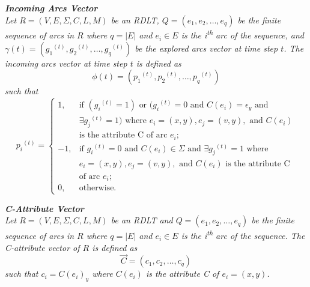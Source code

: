     \begin{defn}\label{def:incoming_arcs_vector}
    \textit{\textbf{Incoming Arcs Vector}\\
    Let $R = (V, E, \Sigma, C, L, M)$ be an RDLT, $Q = (e_{1}, e_{2}, \ldots, e_{q})$ be the finite sequence of arcs in $R$ where $q = |E|$ and $e_{i} \in E$ is the i\textsuperscript{th} arc of the sequence, and $\gamma(t) = ({g_{1}}^{(t)}, {g_{2}}^{(t)}, \ldots, {g_{q}}^{(t)})$ be the explored arcs vector at time step $t$. The incoming arcs vector at time step $t$ is defined as
    \begin{displaymath}
    \phi(t) = ({p_{1}}^{(t)}, {p_{2}}^{(t)}, \ldots, {p_{q}}^{(t)})
    \end{displaymath}
    such that 
    \begin{displaymath}
    {p_{i}}^{(t)} = 
    \left\{
    \begin{array}{rl}
       1, &\text{if $({g_{i}}^{(t)} = 1)$ or $({g_{i}}^{(t)} = 0$ and $C(e_{i}) = \epsilon_{y}$ and}\\
       &\text{$\exists{g_{j}}^{(t)} = 1)$ where $e_{i} = (x,y), e_{j} = (v,y),$ and $C(e_{i})$}\\
       &\text{is the attribute C of arc $e_{i}$;}\\
       -1, &\text{if ${g_{i}}^{(t)} = 0$ and $C(e_{i}) \in \Sigma$ and $\exists{g_{j}}^{(t)} = 1$ where}\\
       &\text{$e_{i} = (x,y), e_{j} = (v,y),$ and $C(e_{i})$ is the attribute C}\\
       &\text{of arc $e_{i}$;}\\
       0, &\text{otherwise.}
    \end{array}
    \right.
    \end{displaymath}}
    \end{defn}
    
    \begin{defn}\label{def:C-attribute_vector}
    \textit{\textbf{C-Attribute Vector}\\
    Let $R = (V, E, \Sigma, C, L, M)$ be an RDLT and $Q = (e_{1}, e_{2}, \ldots, e_{q})$ be the finite sequence of arcs in $R$ where $q = |E|$ and $e_{i} \in E$ is the i\textsuperscript{th} arc of the sequence. The C-attribute vector of $R$ is defined as
    \begin{displaymath}
    \vec{C} = (c_{1}, c_{2}, \ldots, c_{q})
    \end{displaymath}
    such that $c_{i} = C(e_{i})_{y}$ where $C(e_{i})$ is the attribute C of $e_{i} = (x,y)$.}
    \end{defn}

